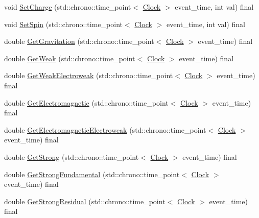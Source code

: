 \begin{DoxyCompactItemize}
\item 
void \mbox{\hyperlink{classMonomer_a1ee35c888318e590082e6cd1772bb430}{Set\+Charge}} (std\+::chrono\+::time\+\_\+point$<$ \mbox{\hyperlink{universe_8h_a0ef8d951d1ca5ab3cfaf7ab4c7a6fd80}{Clock}} $>$ event\+\_\+time, int val) final
\item 
void \mbox{\hyperlink{classMonomer_ad24a86a4c1ac62d1b0ce8040d6b08adf}{Set\+Spin}} (std\+::chrono\+::time\+\_\+point$<$ \mbox{\hyperlink{universe_8h_a0ef8d951d1ca5ab3cfaf7ab4c7a6fd80}{Clock}} $>$ event\+\_\+time, int val) final
\item 
double \mbox{\hyperlink{classMonomer_aa5f7b901e15c9a9eb6e1c3564cd06e4f}{Get\+Gravitation}} (std\+::chrono\+::time\+\_\+point$<$ \mbox{\hyperlink{universe_8h_a0ef8d951d1ca5ab3cfaf7ab4c7a6fd80}{Clock}} $>$ event\+\_\+time) final
\item 
double \mbox{\hyperlink{classMonomer_ac2070d7e39cd0b2a00aa6023ffd51f55}{Get\+Weak}} (std\+::chrono\+::time\+\_\+point$<$ \mbox{\hyperlink{universe_8h_a0ef8d951d1ca5ab3cfaf7ab4c7a6fd80}{Clock}} $>$ event\+\_\+time) final
\item 
double \mbox{\hyperlink{classMonomer_aec6e42dde40c5b3142fab880eabb346a}{Get\+Weak\+Electroweak}} (std\+::chrono\+::time\+\_\+point$<$ \mbox{\hyperlink{universe_8h_a0ef8d951d1ca5ab3cfaf7ab4c7a6fd80}{Clock}} $>$ event\+\_\+time) final
\item 
double \mbox{\hyperlink{classMonomer_ad23f4829d66cb20401cc72a9d72ac320}{Get\+Electromagnetic}} (std\+::chrono\+::time\+\_\+point$<$ \mbox{\hyperlink{universe_8h_a0ef8d951d1ca5ab3cfaf7ab4c7a6fd80}{Clock}} $>$ event\+\_\+time) final
\item 
double \mbox{\hyperlink{classMonomer_a9b270cd1293bc9635813ead284bd3881}{Get\+Electromagnetic\+Electroweak}} (std\+::chrono\+::time\+\_\+point$<$ \mbox{\hyperlink{universe_8h_a0ef8d951d1ca5ab3cfaf7ab4c7a6fd80}{Clock}} $>$ event\+\_\+time) final
\item 
double \mbox{\hyperlink{classMonomer_aa35033340e88c46757d1d5ccba21a21e}{Get\+Strong}} (std\+::chrono\+::time\+\_\+point$<$ \mbox{\hyperlink{universe_8h_a0ef8d951d1ca5ab3cfaf7ab4c7a6fd80}{Clock}} $>$ event\+\_\+time) final
\item 
double \mbox{\hyperlink{classMonomer_a4bc8b39086260e26a196b28b4fc6667f}{Get\+Strong\+Fundamental}} (std\+::chrono\+::time\+\_\+point$<$ \mbox{\hyperlink{universe_8h_a0ef8d951d1ca5ab3cfaf7ab4c7a6fd80}{Clock}} $>$ event\+\_\+time) final
\item 
double \mbox{\hyperlink{classMonomer_a3b00168520f592098356f7cd3e663ad3}{Get\+Strong\+Residual}} (std\+::chrono\+::time\+\_\+point$<$ \mbox{\hyperlink{universe_8h_a0ef8d951d1ca5ab3cfaf7ab4c7a6fd80}{Clock}} $>$ event\+\_\+time) final

\end{DoxyCompactItemize}
